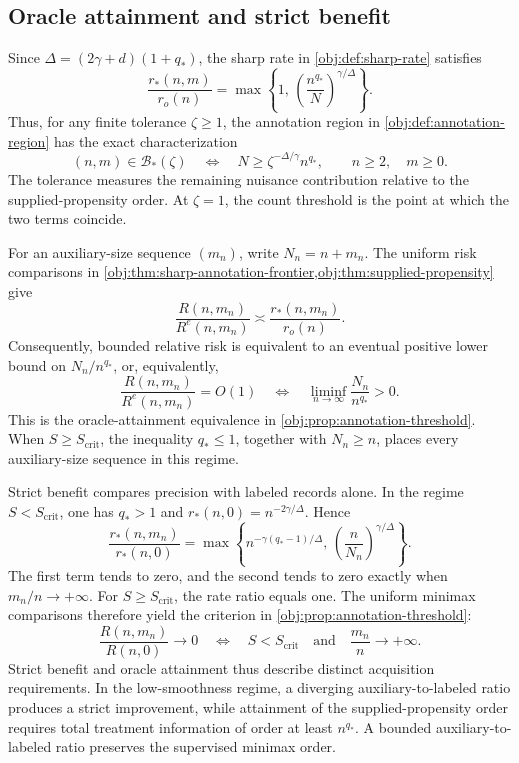 \subsection{Oracle attainment and strict benefit}

Since \(\Delta=(2\gamma+d)(1+q_*)\), the sharp rate in \cref{obj:def:sharp-rate} satisfies
\[
\frac{r_*(n,m)}{r_o(n)}
=
\max\left\{
1,\,
\left(\frac{n^{q_*}}{N}\right)^{\gamma/\Delta}
\right\}.
\]
Thus, for any finite tolerance \(\zeta\ge1\), the annotation region in \cref{obj:def:annotation-region} has the exact characterization
\[
(n,m)\in\mathcal B_*(\zeta)
\quad\Longleftrightarrow\quad
N\ge \zeta^{-\Delta/\gamma}n^{q_*},
\qquad n\ge2,\quad m\ge0.
\]
The tolerance measures the remaining nuisance contribution relative to the supplied-propensity order. At \(\zeta=1\), the count threshold is the point at which the two terms coincide.

For an auxiliary-size sequence \((m_n)\), write \(N_n=n+m_n\). The uniform risk comparisons in \cref{obj:thm:sharp-annotation-frontier,obj:thm:supplied-propensity} give
\[
\frac{R(n,m_n)}{R^e(n,m_n)}
\asymp
\frac{r_*(n,m_n)}{r_o(n)}.
\]
Consequently, bounded relative risk is equivalent to an eventual positive lower bound on \(N_n/n^{q_*}\), or, equivalently,
\[
\frac{R(n,m_n)}{R^e(n,m_n)}=O(1)
\quad\Longleftrightarrow\quad
\liminf_{n\to\infty}\frac{N_n}{n^{q_*}}>0.
\]
This is the oracle-attainment equivalence in \cref{obj:prop:annotation-threshold}. When \(S\ge S_{\mathrm{crit}}\), the inequality \(q_*\le1\), together with \(N_n\ge n\), places every auxiliary-size sequence in this regime.

Strict benefit compares precision with labeled records alone. In the regime \(S<S_{\mathrm{crit}}\), one has \(q_*>1\) and \(r_*(n,0)=n^{-2\gamma/\Delta}\). Hence
\[
\frac{r_*(n,m_n)}{r_*(n,0)}
=
\max\left\{
n^{-\gamma(q_*-1)/\Delta},\,
\left(\frac{n}{N_n}\right)^{\gamma/\Delta}
\right\}.
\]
The first term tends to zero, and the second tends to zero exactly when \(m_n/n\to+\infty\). For \(S\ge S_{\mathrm{crit}}\), the rate ratio equals one. The uniform minimax comparisons therefore yield the criterion in \cref{obj:prop:annotation-threshold}:
\[
\frac{R(n,m_n)}{R(n,0)}\longrightarrow0
\quad\Longleftrightarrow\quad
S<S_{\mathrm{crit}}
\quad\text{and}\quad
\frac{m_n}{n}\longrightarrow+\infty.
\]
Strict benefit and oracle attainment thus describe distinct acquisition requirements. In the low-smoothness regime, a diverging auxiliary-to-labeled ratio produces a strict improvement, while attainment of the supplied-propensity order requires total treatment information of order at least \(n^{q_*}\). A bounded auxiliary-to-labeled ratio preserves the supervised minimax order.

